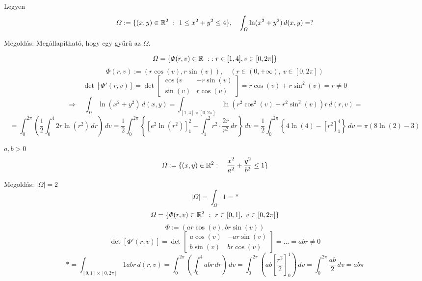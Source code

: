 \documentclass[a4paper,11.5pt]{article}
\begin{document}
	\begin{task}
		Legyen
		\[ \varOmega:=\{ (x,y)\in\R^2\ : \ 1\leq x^2+y^2\leq4 \},\quad \int_{\varOmega}^{}\ln(x^2+y^2)\,d(x,y)=? \]
		
		Megoldás: Megállapítható, hogy egy gyűrű az $\varOmega$.
		
		\[ \varOmega=\{ \varPhi(r,v)\in\mathbb{R}\ :\ : r\in[1,4],v\in[0,2\pi] \} \]
		\[ \varPhi(r,v):=\left(r\cos(v),r\sin(v)\right),\quad (r\in(0,+\infty),\ v\in[0,2\pi]) \]
		\[ \det[\varPhi'(r,v)]=\det \begin{bmatrix}
			\cos(v&-r\sin(v)\\
			\sin(v)&r\cos(v)
		\end{bmatrix}=r\cos(v)+r\sin^2(v)=r\not=0 \]
		\[\Rightarrow\quad \int_{\varOmega}^{}\ln(x^2+y^2)\,d(x,y)=\int_{[1,4]\times[0,2\pi]}^{}\ln(r^2\cos^2(v)+r^2\sin^2(v))r\,d(r,v)=\]
		\[=\int_{0}^{2\pi}\left(\frac{1}{2}\int_{0}^{4}2r\ln(r^2)\,dr\right)\,dv=\frac{1}{2}\int_{0}^{2\pi}\left\{[e^2\ln(r^2)]_1^2-\int_{1}^{2}r^2\cdot\frac{2r}{r^2}\,dr\right\}\,dv=\frac{1}{2}\int_0^{2\pi}\left\{4\ln(4)-[r^2]_1^4 \right\}\,dv=\pi(8\ln(2)-3) \] 
	\end{task}
	\begin{task}
		$a,b>0$
		\[ \varOmega:=\{ (x,y)\in\mathbb{R}^2:\quad \frac{x^2}{a^2}+\frac{y^2}{b^2}\leq1 \} \]
		
		Megoldás: $|\varOmega|=2$
		\[ |\varOmega|=\int_{\varOmega}^{}1=* \]
		\[ \varOmega=\{ \varPhi(r,v)\in\R^2\ : \ r\in[0,1],\ v\in[0,2\pi] \} \]
		\[ \varPhi:=(ar\cos(v),br\sin(v)) \]
		\[ \det[\varPhi'(r,v)]=\det \begin{bmatrix}
			a\cos(v)&-ar\sin(v)\\
			b\sin(v)&br\cos(v)
		\end{bmatrix}=\ldots=abr\not=0 \]
		\[ *=\int_{[0,1]\times[0,2\pi]}^{}1abr\,d(r,v)=\int_{0}^{2\pi}\left(\int_0^4abr\,dr\right)\,dv=\int_0^{2\pi}\left(ab\left[\frac{r^2}{2}\right]_0^1\right)\,dv=\int_0^{2\pi}\frac{ab}{2}\,dv=ab\pi \]
	\end{task}
\end{document}
